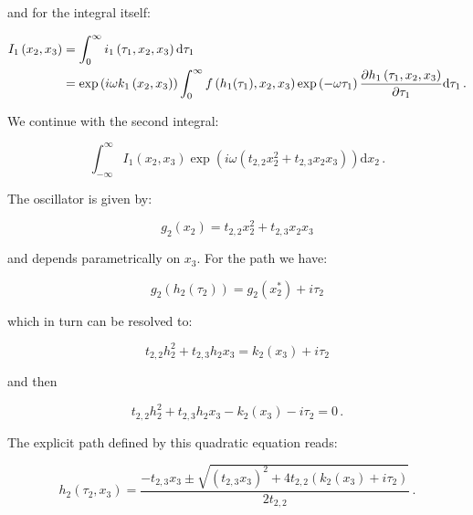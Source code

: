 \documentclass[a4paper,10pt]{article}
\begin{document}
and for the integral itself:

\begin{equation}
\begin{split}
  I_1\left(x_2, x_3\right) & = \int_0^{\infty} i_1\left(\tau_1, x_2, x_3\right) \mathrm{d}\tau_1 \\
                           & = \exp\left(i \omega k_1\left(x_2, x_3\right) \right)
                               \int_0^{\infty} f\left(h_1(\tau_1), x_2, x_3\right)
                                               \exp\left(- \omega \tau_1 \right)
                                               \frac{\partial h_1\left(\tau_1, x_2, x_3\right)}{\partial \tau_1}
                               \mathrm{d}\tau_1 \,.
\end{split}
\end{equation}


We continue with the second integral:

\begin{equation}
  \int_{-\infty}^{\infty} I_1\left(x_2, x_3\right)
                          \exp\left(i \omega \left(t_{2,2} x_2^2 + t_{2,3} x_2 x_3\right) \right)
  \mathrm{d}x_2 \,.
\end{equation}

The oscillator is given by:

\begin{equation}
 g_2(x_2) = t_{2,2} x_2^2 + t_{2,3} x_2 x_3
\end{equation}

and depends parametrically on $x_3$. For the path we have:

\begin{equation}
  g_2\left(h_2(\tau_2)\right) = g_2\left(x_2^{*}\right) + i \tau_2
\end{equation}

which in turn can be resolved to:

\begin{equation}
  t_{2,2} h_2^2 + t_{2,3} h_2 x_3 = k_2(x_3) + i \tau_2
\end{equation}

and then

\begin{equation}
  t_{2,2} h_2^2 + t_{2,3} h_2 x_3 - k_2(x_3) - i \tau_2 = 0 \,.
\end{equation}

The explicit path defined by this quadratic equation reads:

\begin{equation}
  h_2\left(\tau_2, x_3\right) =
  \frac{-t_{2,3}x_3 \pm
    \sqrt{\left(t_{2,3}x_3\right)^2 + 4 t_{2,2} \left(k_2(x_3) + i \tau_2\right)}
  }{2 t_{2,2}} \,.
\end{equation}
\end{document}
